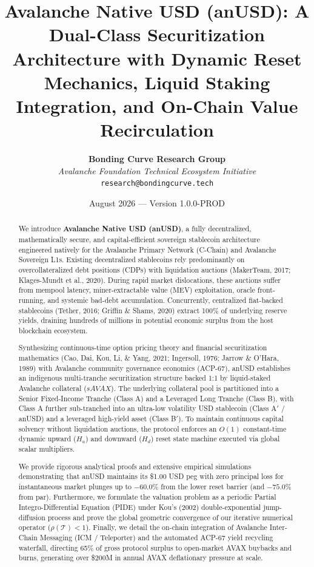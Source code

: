 \documentclass[11pt,a4paper]{article}
\title{\textbf{Avalanche Native USD (anUSD): A Dual-Class Securitization Architecture with Dynamic Reset Mechanics, Liquid Staking Integration, and On-Chain Value Recirculation}}
\author{
    \textbf{Bonding Curve Research Group} \\
    \textit{Avalanche Foundation Technical Ecosystem Initiative} \\
    \texttt{research@bondingcurve.tech}
}
\date{August 2026 --- Version 1.0.0-PROD}
\begin{document}
\maketitle

\begin{abstract}
We introduce \textbf{Avalanche Native USD (anUSD)}, a fully decentralized, mathematically secure, and capital-efficient sovereign stablecoin architecture engineered natively for the Avalanche Primary Network (C-Chain) and Avalanche Sovereign L1s. Existing decentralized stablecoins rely predominantly on overcollateralized debt positions (CDPs) with liquidation auctions (MakerTeam, 2017; Klages-Mundt et al., 2020). During rapid market dislocations, these auctions suffer from mempool latency, miner-extractable value (MEV) exploitation, oracle front-running, and systemic bad-debt accumulation. Concurrently, centralized fiat-backed stablecoins (Tether, 2016; Griffin \& Shams, 2020) extract 100\% of underlying reserve yields, draining hundreds of millions in potential economic surplus from the host blockchain ecosystem.

Synthesizing continuous-time option pricing theory and financial securitization mathematics (Cao, Dai, Kou, Li, \& Yang, 2021; Ingersoll, 1976; Jarrow \& O'Hara, 1989) with Avalanche community governance economics (ACP-67), anUSD establishes an indigenous multi-tranche securitization structure backed 1:1 by liquid-staked Avalanche collateral ($sAVAX$). The underlying collateral pool is partitioned into a Senior Fixed-Income Tranche (Class A) and a Leveraged Long Tranche (Class B), with Class A further sub-tranched into an ultra-low volatility USD stablecoin (Class A$'$ / anUSD) and a leveraged high-yield asset (Class B$'$). To maintain continuous capital solvency without liquidation auctions, the protocol enforces an $O(1)$ constant-time dynamic upward ($H_u$) and downward ($H_d$) reset state machine executed via global scalar multipliers.

We provide rigorous analytical proofs and extensive empirical simulations demonstrating that anUSD maintains its \$1.00 USD peg with zero principal loss for instantaneous market plunges up to \textbf{$-60.0\%$} from the lower reset barrier (and \textbf{$-75.0\%$} from par). Furthermore, we formulate the valuation problem as a periodic Partial Integro-Differential Equation (PIDE) under Kou's (2002) double-exponential jump-diffusion process and prove the global geometric convergence of our iterative numerical operator ($\rho(\mathcal{T}) < 1$). Finally, we detail the on-chain integration of Avalanche Inter-Chain Messaging (ICM / Teleporter) and the automated ACP-67 yield recycling waterfall, directing 65\% of gross protocol surplus to open-market AVAX buybacks and burns, generating over \$200M in annual AVAX deflationary pressure at scale.
\end{abstract}
\end{document}
